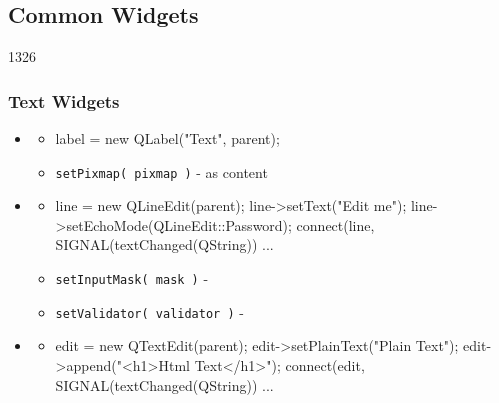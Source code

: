 %
%
%
%

\subsection{Common Widgets}

\begin{slide}[fragile]{1326}
  \frametitle{Text Widgets}
  \begin{itemize}
  \item \textbf{}
    \begin{itemize}
    \item[] \begin{cpp}
label = new QLabel("Text", parent);
     \end{cpp}
    \item \texttt{setPixmap( pixmap )} - as content
    \end{itemize}
  \item \textbf{}
    \begin{itemize}
    \item[]
      \begin{cpp}
line = new QLineEdit(parent);        
line->setText("Edit me");
line->setEchoMode(QLineEdit::Password);
connect(line, SIGNAL(textChanged(QString)) ...
      \end{cpp}
    \item \texttt{setInputMask( mask )} -
    \item \texttt{setValidator( validator )} - 
   \end{itemize}
  \item \textbf{}
    \begin{itemize}
    \item[]
      \begin{cpp}
edit = new QTextEdit(parent);
edit->setPlainText("Plain Text");        
edit->append("<h1>Html Text</h1>");
connect(edit, SIGNAL(textChanged(QString)) ...
      \end{cpp}
   \end{itemize}
\end{itemize}
\end{slide}

